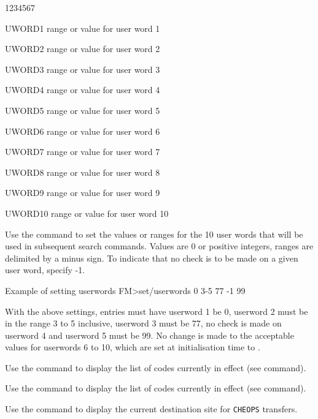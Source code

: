 \begin{DLtt}{1234567}
\item[UWORD1] range or value for user word 1 
\item[UWORD2] range or value for user word 2
\item[UWORD3] range or value for user word 3
\item[UWORD4] range or value for user word 4
\item[UWORD5] range or value for user word 5
\item[UWORD6] range or value for user word 6
\item[UWORD7] range or value for user word 7
\item[UWORD8] range or value for user word 8
\item[UWORD9] range or value for user word 9
\item[UWORD10] range or value for user word 10
\end{DLtt}
Use the  command to set the values or ranges
for the 10 user words that will be used in subsequent search
commands. Values are 0 or positive integers, ranges are 
delimited by a minus sign. To indicate that no check is to
be made on a given user word, specify -1.

\begin{XMPt}{Example of setting userwords}
FM>set/userwords 0 3-5 77 -1 99
\end{XMPt}

With the above settings, entries must have userword 1 be 0, 
userword 2 must be in the range 3 to 5 inclusive, userword 3
must be 77, no check is made on userword 4 and userword 5 must
be 99. No change is made to the acceptable values for userwords
6 to 10, which are set at initialisation time to .


Use the  command to display the list of 
 codes currently in effect
(see  command).


Use the  command to display the list of
 codes currently in effect
(see  command).


Use the  command to display the current
destination site for {\tt CHEOPS} transfers.

